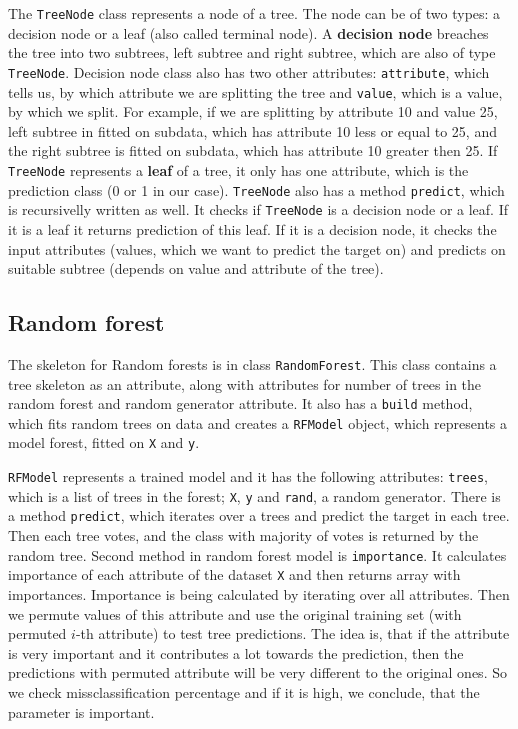 \documentclass{article}
\begin{document}
The \texttt{TreeNode} class represents a node of a tree. The node can be of two types: a decision node or a leaf (also called terminal node). A \textbf{decision node} breaches the tree into two subtrees, left subtree and right subtree, which are also of type \texttt{TreeNode}. Decision node class also has two other attributes: \texttt{attribute}, which tells us, by which attribute we are splitting the tree and \texttt{value}, which is a value, by which we split. For example, if we are splitting by attribute 10 and value 25, left subtree in fitted on subdata, which has attribute 10 less or equal to 25, and the right subtree is fitted on subdata, which has attribute 10 greater then 25. If \texttt{TreeNode} represents a \textbf{leaf} of a tree, it only has one attribute, which is the prediction class (0 or 1 in our case). \texttt{TreeNode} also has a method \texttt{predict}, which is recursivelly written as well. It checks if \texttt{TreeNode} is a decision node or a leaf. If it is a leaf it returns prediction of this leaf. If it is a decision node, it checks the input attributes (values, which we want to predict the target on) and predicts on suitable subtree (depends on value and attribute of the tree).

\subsection{Random forest}

The skeleton for Random forests is in class \texttt{RandomForest}. This class contains a tree skeleton as an attribute, along with attributes for number of trees in the random forest and random generator attribute. It also has a \texttt{build} method, which fits random trees on data and creates a \texttt{RFModel} object, which represents a model forest, fitted on \texttt{X} and \texttt{y}.

\texttt{RFModel} represents a trained model and it has the following attributes: \texttt{trees}, which is a list of trees in the forest; \texttt{X}, \texttt{y} and \texttt{rand}, a random generator. There is a method \texttt{predict}, which iterates over a trees and predict the target in each tree. Then each tree votes, and the class with majority of votes is returned by the random tree. Second method in random forest model is \texttt{importance}. It calculates importance of each attribute of the dataset \texttt{X} and then returns array with importances. Importance is being calculated by iterating over all attributes. Then we permute values of this attribute and use the original training set (with permuted $i$-th attribute) to test tree predictions. The idea is, that if the attribute is very important and it contributes a lot towards the prediction, then the predictions with permuted attribute will be very different to the original ones. So we check missclassification percentage and if it is high, we conclude, that the parameter is important.
\end{document}
